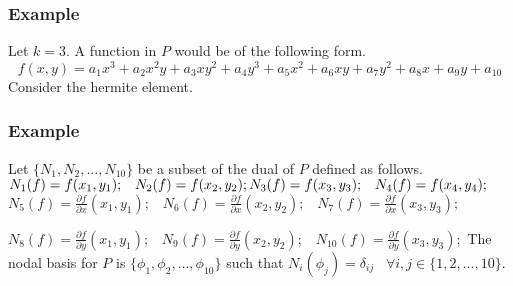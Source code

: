 \documentclass{beamer}
\begin{document}
\begin{frame}
\frametitle{Example}
	Let $k=3$. A function in $P$ would be of the following form. $$f(x,y)=a_1 x^3+a_2 x^2 y+a_3 x y^2+a_4 y^3+a_5 x^2+a_6 xy+a_7 y^2+a_8 x+a_9 y+a_{10}$$
	Consider the hermite element.
	
\end{frame}
\begin{frame}
\frametitle{Example}

	Let $\{N_1,N_2,...,N_{10}\}$ be a subset of the dual of $P$ defined as follows.
		\linebreak\linebreak
	$N_1(f)=f(x_1,y_1); \;\;\; N_2(f)=f(x_2,y_2); \linebreak N_3(f)=f(x_3,y_3); \;\;\; N_4(f)=f(x_4,y_4); $
	\linebreak\linebreak
	$N_5(f)=\frac{\partial f}{\partial x}(x_1,y_1); \;\;\; N_6(f)=\frac{\partial f}{\partial x}(x_2,y_2); \;\;\; N_7(f)=\frac{\partial f}{\partial x}(x_3,y_3);$
		\linebreak\linebreak
		
	$N_8(f)=\frac{\partial f}{\partial y}(x_1,y_1); \;\;\; N_9(f)=\frac{\partial f}{\partial y}(x_2,y_2); \;\;\; N_{10}(f)=\frac{\partial f}{\partial y}(x_3,y_3);$
		\linebreak\linebreak
	The nodal basis for $P$ is $\{\phi_1,\phi_2,...,\phi_{10}\}$ such that $N_i(\phi_j)=\delta_{ij} \;\;\; \forall i,j \in \{1,2,...,10\}$.
\end{frame}
\end{document}
